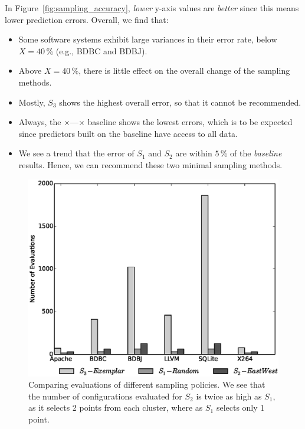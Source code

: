 \documentclass{newsig}
\newcommand{\fig}[1]{Figure~\ref{fig:#1}}
\begin{document}
In \fig{sampling_accuracy}, {\em lower} y-axis values  are {\em better} since this means lower
prediction errors. Overall, we find that:
\begin{itemize}

\item Some software systems exhibit large variances in their error rate, below $X=40$\,\% (e.g., BDBC and BDBJ).
\item Above $X=40$\,\%, there is little effect on the overall change of the sampling methods.
\item
Mostly, $S_3$ shows the highest overall error, 
so that it cannot be recommended.
\item Always, the   $\times$\hspace{-2pt}---\hspace{-2pt}$\times$ baseline shows the lowest errors, which is to be
expected since predictors built on the baseline have access to all data.
\item
We see a trend that the error of  $S_1$ and $S_2$ are within $5$\,\% of the {\em baseline} results.
Hence, we can recommend these two minimal sampling methods.
\end{itemize}

\begin{figure}[tbh]
\centering
\includegraphics[width=0.9\columnwidth]{Figures/evaluation_graph}
\caption{Comparing evaluations of different sampling policies. We see that the number of configurations evaluated for $S_2$ is twice as high as $S_1$, as it selects 2 points from each cluster, where as  $S_1$ selects only 1 point. }\label{fig:Evaluations}
\end{figure}
\end{document}
